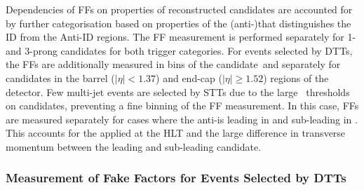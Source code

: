 Dependencies of FFs on properties of reconstructed \tauhadvis candidates are
accounted for by further categorisation based on properties of the
(anti-)\tauhadvis that distinguishes the ID from the Anti-ID regions. The FF
measurement is performed separately for 1- and 3-prong \tauhadvis candidates for
both trigger categories. For events selected by DTTs, the FFs are additionally
measured in bins of the \tauhadvis candidate~\pT and separately for candidates
in the barrel ($|\eta| < 1.37$) and end-cap ($|\eta| \geq 1.52$) regions of the
detector. Few multi-jet events are selected by STTs due to the large
\pT~thresholds on \tauhadvis candidates, preventing a fine binning of the FF
measurement. In this case, FFs are measured separately for cases where the
anti-\tauhadvis is leading in \pT and sub-leading in \pT. This accounts for the
\tauid applied at the HLT and the large difference in transverse momentum
between the leading and sub-leading \tauhadvis candidate.


\subsubsection{Measurement of Fake Factors for Events Selected by DTTs}

